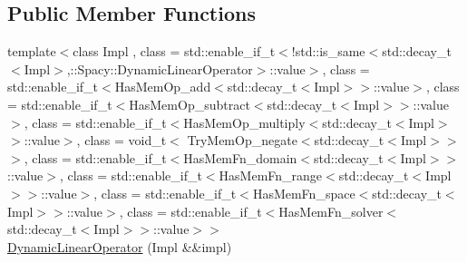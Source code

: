 \subsection*{Public Member Functions}
\begin{DoxyCompactItemize}
\item 
\hypertarget{classSpacy_1_1DynamicLinearOperator_a10923cade3cd0774e6971f0d4e3da65f}{}{\footnotesize template$<$class Impl , class  = std\+::enable\+\_\+if\+\_\+t$<$!std\+::is\+\_\+same$<$std\+::decay\+\_\+t$<$\+Impl$>$,\+::\+Spacy\+::\+Dynamic\+Linear\+Operator$>$\+::value$>$, class  = std\+::enable\+\_\+if\+\_\+t$<$\+Has\+Mem\+Op\+\_\+add$<$std\+::decay\+\_\+t$<$\+Impl$>$$>$\+::value$>$, class  = std\+::enable\+\_\+if\+\_\+t$<$\+Has\+Mem\+Op\+\_\+subtract$<$std\+::decay\+\_\+t$<$\+Impl$>$$>$\+::value$>$, class  = std\+::enable\+\_\+if\+\_\+t$<$\+Has\+Mem\+Op\+\_\+multiply$<$std\+::decay\+\_\+t$<$\+Impl$>$$>$\+::value$>$, class  = void\+\_\+t$<$ Try\+Mem\+Op\+\_\+negate$<$std\+::decay\+\_\+t$<$\+Impl$>$$>$ $>$, class  = std\+::enable\+\_\+if\+\_\+t$<$\+Has\+Mem\+Fn\+\_\+domain$<$std\+::decay\+\_\+t$<$\+Impl$>$$>$\+::value$>$, class  = std\+::enable\+\_\+if\+\_\+t$<$\+Has\+Mem\+Fn\+\_\+range$<$std\+::decay\+\_\+t$<$\+Impl$>$$>$\+::value$>$, class  = std\+::enable\+\_\+if\+\_\+t$<$\+Has\+Mem\+Fn\+\_\+space$<$std\+::decay\+\_\+t$<$\+Impl$>$$>$\+::value$>$, class  = std\+::enable\+\_\+if\+\_\+t$<$\+Has\+Mem\+Fn\+\_\+solver$<$std\+::decay\+\_\+t$<$\+Impl$>$$>$\+::value$>$$>$ }\\\hyperlink{classSpacy_1_1DynamicLinearOperator_a10923cade3cd0774e6971f0d4e3da65f}{Dynamic\+Linear\+Operator} (Impl \&\&impl)\label{classSpacy_1_1DynamicLinearOperator_a10923cade3cd0774e6971f0d4e3da65f}


\end{DoxyCompactItemize}
